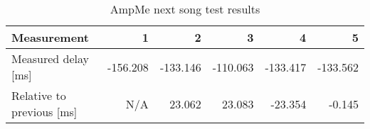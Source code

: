 \begin{table}[h]
\centering
\begin{tabular}{|l|r|r|r|r|r|}
\hline
Measurement                 & 1         & 2        & 3        & 4        & 5         \\ \hline
Measured delay [ms]         & -156.208  & -133.146 & -110.063 & -133.417 & -133.562  \\ \hline
Relative to previous [ms]   & N/A       & 23.062   & 23.083   & -23.354   & -0.145    \\ \hline
\end{tabular}
\caption{AmpMe next song test results}
\label{fig:ampmenextsongfigure}
\end{table}

